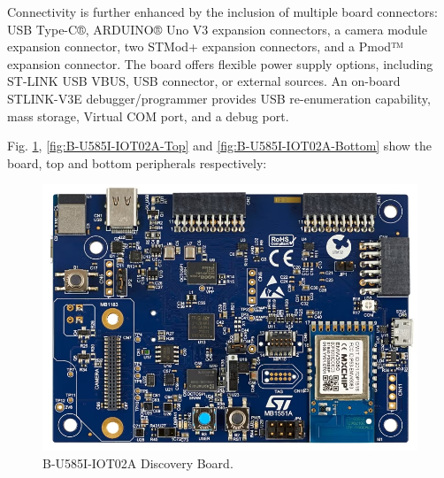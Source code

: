 \documentclass[10pt,a4paper,onecolumn]{article}
\begin{document}
Connectivity is further enhanced by the inclusion of multiple board connectors: USB Type-C®, ARDUINO® Uno V3 expansion connectors, a camera module expansion connector, two STMod+ expansion connectors, and a Pmod™ expansion connector. The board offers flexible power supply options, including ST-LINK USB VBUS, USB connector, or external sources. An on-board STLINK-V3E debugger/programmer provides USB re-enumeration capability, mass storage, Virtual COM port, and a debug port.

Fig. \ref{fig:B-U585I-IOT02A-Board}, \ref{fig:B-U585I-IOT02A-Top} and \ref{fig:B-U585I-IOT02A-Bottom} show the board, top and bottom peripherals respectively:

\begin{figure}[H]
  \begin{center}
    \includegraphics[width=\dimexpr\textwidth-1cm\relax,height=\dimexpr0.25\textheight-1cm\relax,keepaspectratio]{images/board2.png}
    \caption{B-U585I-IOT02A Discovery Board.}
    \label{fig:B-U585I-IOT02A-Board}
  \end{center}
\end{figure}
\end{document}
